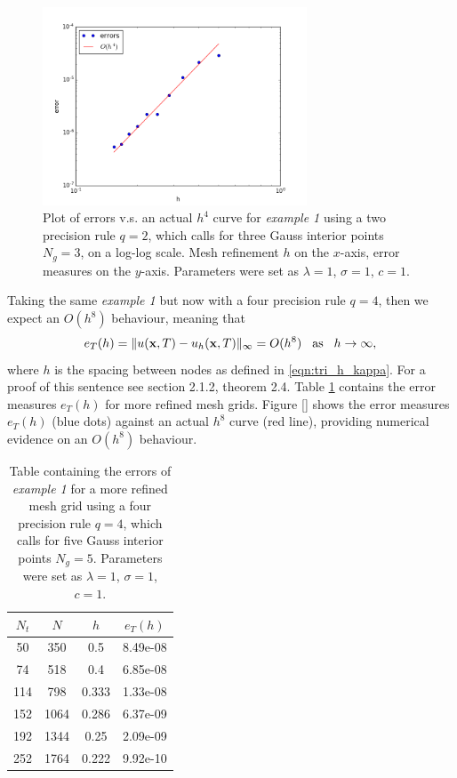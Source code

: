 \documentclass{uonmathreport}
\begin{document}
\begin{figure}[H]
	\begin{center}
		\includegraphics[width=0.7\textwidth]{Figures/2dTriTest1_q=2,Ng=3.png}
	\end{center}
	\caption{Plot of errors v.s. an actual $h^4$ curve for \textit{example 1} using a two precision rule $q=2$, which calls for three Gauss interior points $N_g=3$, on a log-log scale. Mesh refinement $h$ on the $x$-axis, error measures on the $y$-axis. Parameters were set as $\lambda=1$, $\sigma=1$, $c=1$.}
	\label{fig:2dTri_Errors_test1_q2}
\end{figure}

Taking the same \textit{example 1} but now with a four precision rule $q=4$, then we expect an $O(h^8)$ behaviour, meaning that
\begin{equation}
e_T(h) = \| u(\mathbf{x}, T) -  u_h(\mathbf{x}, T)\|_{\infty} = O(h^8) \hspace{3mm}
\textnormal{as} \hspace{3mm} h \rightarrow \infty,
\end{equation}
where $h$ is the spacing between nodes as defined in \ref{eqn:tri_h_kappa}. For a proof of this sentence see \cite{lima2015numerical} section 2.1.2, theorem 2.4. Table \ref{table:2dTri_Errors_test1_q4} contains the error measures $e_T(h)$ for more refined mesh grids. Figure \ref{} shows the error measures $e_T(h)$ (blue dots) against an actual $h^8$ curve (red line), providing numerical evidence on an $O(h^8)$ behaviour.

\begin{table}[H]
	\centering
	\begin{tabular}{|c|c|c|c|}
		\hline
		$N_t$&$N$&$h$&$e_T(h)$\\
		\hline
		50&350&0.5&8.49e-08\\
		74&518&0.4&6.85e-08\\
		114&798&0.333&1.33e-08\\
		152&1064&0.286&6.37e-09\\
		192&1344&0.25&2.09e-09\\
		252&1764&0.222&9.92e-10\\
		\hline
	\end{tabular}
	\caption{Table containing the errors of \textit{example 1} for a more refined mesh grid using a four precision rule $q=4$, which calls for five Gauss interior points $N_g=5$. Parameters were set as $\lambda=1$, $\sigma=1$, $c=1$.}
	\label{table:2dTri_Errors_test1_q4}
\end{table}
\end{document}
